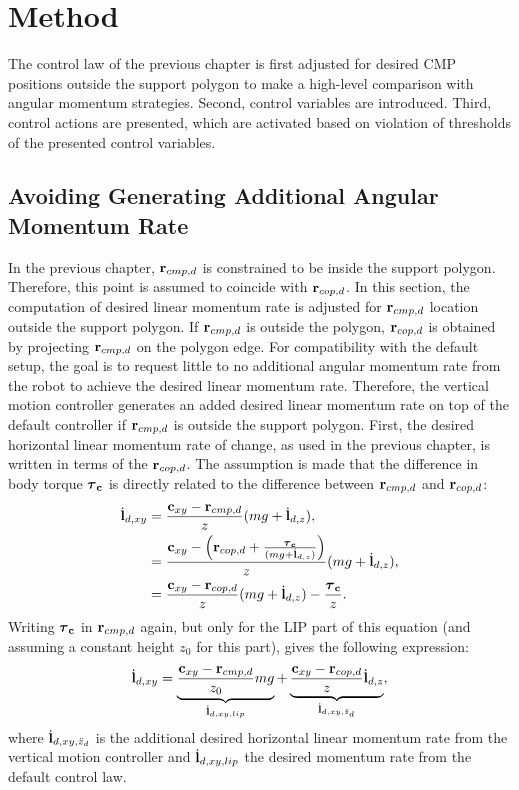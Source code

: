 \section{Method}
The control law of the previous chapter is first adjusted for desired \ac{CMP} positions outside the support polygon to make a high-level comparison with angular momentum strategies. Second, control variables are introduced. Third, control actions are presented, which are activated based on violation of thresholds of the presented control variables.

\subsection{Avoiding Generating Additional Angular Momentum Rate}
In the previous chapter, $\mathbf{r}_{cmp,d}$ is constrained to be inside the support polygon. Therefore, this point is assumed to coincide with $\mathbf{r}_{cop,d}$. In this section, the computation of desired linear momentum rate is adjusted for $\mathbf{r}_{cmp,d}$ location outside the support polygon. If $\mathbf{r}_{cmp,d}$ is outside the polygon, $\mathbf{r}_{cop,d}$ is obtained by projecting $\mathbf{r}_{cmp,d}$ on the polygon edge. For compatibility with the default setup, the goal is to request little to no additional angular momentum rate from the robot to achieve the desired linear momentum rate. Therefore, the vertical motion controller generates an added desired linear momentum rate on top of the default controller if $\mathbf{r}_{cmp,d}$ is outside the support polygon. First, the desired horizontal linear momentum rate of change, as used in the previous chapter, is written in terms of the $\mathbf{r}_{cop,d}$. The assumption is made that the difference in body torque $\boldsymbol{\tau}_{\mathbf{c}}$ is directly related to the difference between $\mathbf{r}_{cmp,d}$ and $\mathbf{r}_{cop,d}$:
\begin{align}
    \dot{\mathbf{l}}_{d,xy} &= \frac{\mathbf{c}_{xy}-\mathbf{r}_{cmp,d}}{z}(mg+\dot{\mathbf{l}}_{d,z}),\\
&=\frac{\mathbf{c}_{xy}-\Big(\mathbf{r}_{cop,d}+\frac{\boldsymbol{\tau}_{\mathbf{c}}}{(mg+\dot{\mathbf{l}}_{d,z})}\Big)}{z}(mg+\dot{\mathbf{l}}_{d,z}), \\
&=\frac{\mathbf{c}_{xy}-\mathbf{r}_{cop,d}}{z}(mg + \dot{\mathbf{l}}_{d,z})- \frac{\boldsymbol{\tau}_{\mathbf{c}}}{z}.
\end{align}
Writing $\boldsymbol{\tau}_{\mathbf{c}}$ in $\mathbf{r}_{cmp,d}$ again, but only for the \ac{LIP} part of this equation (and assuming a constant height $z_0$ for this part), gives the following expression:
 \begin{equation}
\dot{\mathbf{l}}_{d,xy} = \underbrace{ \frac{\mathbf{c}_{xy}-\mathbf{r}_{cmp,d}} {z_0}mg}_{\dot{\mathbf{l}}_{d,xy,lip}}  + \underbrace{\frac{\mathbf{c}_{xy}-\mathbf{r}_{cop,d}}{z}\dot{\mathbf{l}}_{d,z}}_{\dot{\mathbf{l}}_{d,xy,\ddot{z}_d}},
\end{equation}
where $\dot{\mathbf{l}}_{d,xy,\ddot{z}_d}$ is the additional desired horizontal linear momentum rate from the vertical motion controller and $\dot{\mathbf{l}}_{d,xy,lip}$ the desired momentum rate from the default control law.

